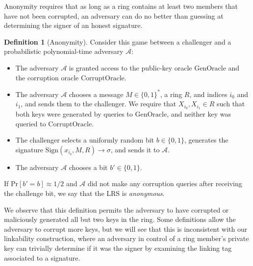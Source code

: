 \documentclass{article}
\newcommand{\A}{\mathcal{A}}
\theoremstyle{definition}
\newtheorem{definition}{Definition}
\begin{document}
Anonymity requires that as long as a ring contains at least two members that have not been corrupted, an adversary can do no better than guessing at determining the signer of an honest signature.
\begin{definition}[Anonymity]
Consider this game between a challenger and a probabilistic polynomial-time adversary $\A$:
\begin{itemize}
\item The adversary $\A$ is granted access to the public-key oracle $\text{GenOracle}$ and the corruption oracle $\text{CorruptOracle}$.
\item The adversary $\A$ chooses a message $M \in \{0,1\}^*$, a ring $R$, and indices $i_0$ and $i_1$, and sends them to the challenger.
We require that $X_{i_0},X_{i_1} \in R$ such that both keys were generated by queries to $\text{GenOracle}$, and neither key was queried to $\text{CorruptOracle}$.
\item The challenger selects a uniformly random bit $b \in \{0,1\}$, generates the signature $\text{Sign}(x_{i_b},M,R) \to \sigma$, and sends it to $\A$.
\item The adversary $\A$ chooses a bit $b' \in \{0,1\}$.
\end{itemize}
If $\text{Pr}[ b' = b ] \approx 1/2$ and $\A$ did not make any corruption queries after receiving the challenge bit, we say that the LRS is \textit{anonymous}.
\end{definition}
We observe that this definition permits the adversary to have corrupted or maliciously generated all but two keys in the ring.
Some definitions allow the adversary to corrupt more keys, but we will see that this is inconsistent with our linkability construction, where an adversary in control of a ring member's private key can trivially determine if it was the signer by examining the linking tag associated to a signature.
\end{document}
